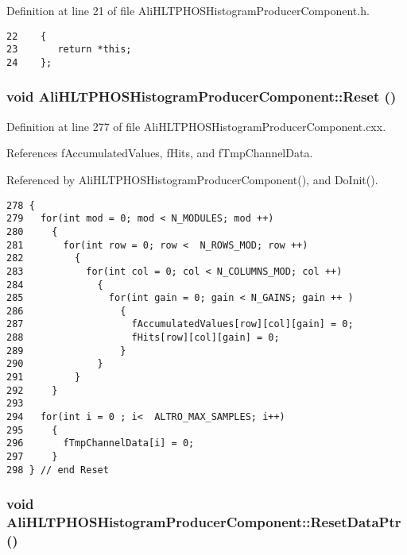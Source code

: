 Definition at line 21 of file Ali\-HLTPHOSHistogram\-Producer\-Component.h.

\footnotesize\begin{verbatim}22    {
23       return *this;
24    };
\end{verbatim}\normalsize 


\subsubsection{\setlength{\rightskip}{0pt plus 5cm}void Ali\-HLTPHOSHistogram\-Producer\-Component::Reset ()\hspace{0.3cm}{\tt  [protected]}}\label{classAliHLTPHOSHistogramProducerComponent_b0}




Definition at line 277 of file Ali\-HLTPHOSHistogram\-Producer\-Component.cxx.

References f\-Accumulated\-Values, f\-Hits, and f\-Tmp\-Channel\-Data.

Referenced by Ali\-HLTPHOSHistogram\-Producer\-Component(), and Do\-Init().

\footnotesize\begin{verbatim}278 {
279   for(int mod = 0; mod < N_MODULES; mod ++)
280     {
281       for(int row = 0; row <  N_ROWS_MOD; row ++)
282         {
283           for(int col = 0; col < N_COLUMNS_MOD; col ++)
284             {
285               for(int gain = 0; gain < N_GAINS; gain ++ )
286                 { 
287                   fAccumulatedValues[row][col][gain] = 0;
288                   fHits[row][col][gain] = 0;      
289                 }
290             }
291         }
292     }
293 
294   for(int i = 0 ; i<  ALTRO_MAX_SAMPLES; i++)
295     {
296       fTmpChannelData[i] = 0;
297     }
298 } // end Reset
\end{verbatim}\normalsize 


\subsubsection{\setlength{\rightskip}{0pt plus 5cm}void Ali\-HLTPHOSHistogram\-Producer\-Component::Reset\-Data\-Ptr ()\hspace{0.3cm}{\tt  [protected]}}\label{classAliHLTPHOSHistogramProducerComponent_b1}




